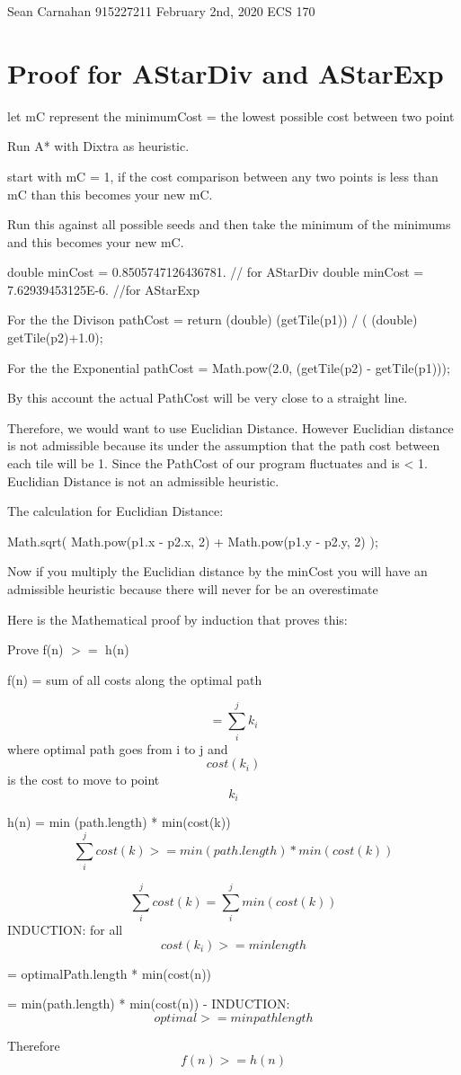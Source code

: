 \documentclass{article}
\begin{document}
Sean Carnahan
915227211
February 2nd, 2020
ECS 170
\section{Proof for AStarDiv and AStarExp}

 
 let mC represent the minimumCost = the lowest possible cost between two point
 
 Run A* with Dixtra as heuristic.
 
 start with mC = 1, if the cost comparison between any two points is less than mC than this becomes your new mC. 
 
 Run this against all possible seeds and then take the minimum of the minimums and this becomes your new mC.
 
 double minCost = 0.8505747126436781. // for AStarDiv
 double minCost = 7.62939453125E-6.    //for AStarExp

 For the the Divison pathCost =  return (double) (getTile(p1)) /  ( (double) getTile(p2)+1.0);
 
 For the the Exponential pathCost =  Math.pow(2.0, (getTile(p2) - getTile(p1)));
 
 By this account the actual PathCost will be very close to a straight line.
 
 Therefore, we would want to use Euclidian Distance. However Euclidian distance is not admissible because its under the assumption that the path cost between each tile will be 1. Since the PathCost of our program fluctuates and is < 1. Euclidian Distance is not an admissible heuristic. 
 
The calculation for Euclidian Distance: 

Math.sqrt( Math.pow(p1.x - p2.x, 2) + Math.pow(p1.y - p2.y, 2) );

Now if you multiply the Euclidian distance by the minCost you will have an admissible heuristic because there will never for be an overestimate

Here is the Mathematical proof by induction that proves this:

Prove f(n) $>=$ h(n)

f(n) = sum of all costs along the optimal path

       $$=\sum_{i}^{j} k_{i} $$ where optimal path goes from i to j and $$cost(k_{i})$$ is the cost to move to point $$k_{i}$$
       
h(n) = min (path.length) * min(cost(k))
	$$\sum_{i}^{j} cost(k) >= min(path.length) * min(cost(k))$$
	
	$$\sum_{i}^{j} cost(k) = \sum_{i}^{j} min(cost(k))$$  INDUCTION: for all $$cost(k_{i}) >= minlength$$
	
= optimalPath.length * min(cost(n))

= min(path.length) * min(cost(n)) - INDUCTION: $$optimal >= min path length$$

Therefore $$f(n) >= h(n)$$
\end{document}
